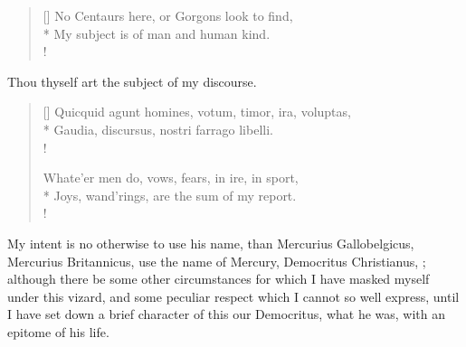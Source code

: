 {\begin{verse}[\versewidth]
No Centaurs here, or Gorgons look to find,\\*
My subject is of man and human kind.\\!
\end{verse}
Thou thyself art the subject of my discourse.
\settowidth{\versewidth}{Quicquid agunt homines, votum, timor, ira, voluptas,}
\begin{verse}[\versewidth]
\textlatin{Quicquid agunt homines, votum, timor, ira, voluptas,}\\*
\textlatin{Gaudia, discursus, nostri farrago libelli.}\\!

Whate'er men do, vows, fears, in ire, in sport,\\*
Joys, wand'rings, are the sum of my report.\\!
\end{verse}

My intent is no otherwise to use his name, than Mercurius
Gallobelgicus, Mercurius Britannicus, use the name of Mercury,
Democritus Christianus, \etc; although there be some other
circumstances for which I have masked myself under this vizard, and
some peculiar respect which I cannot so well express, until I have set
down a brief character of this our Democritus, what he was, with an
epitome of his life.

}
